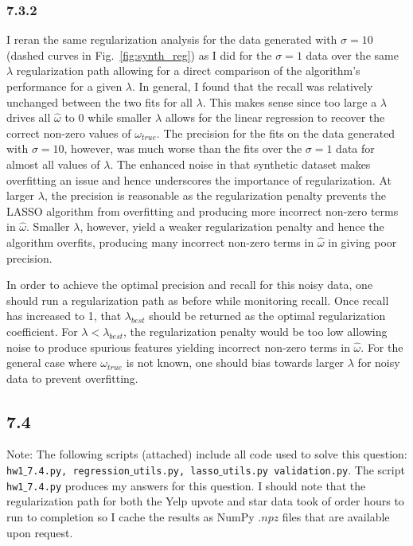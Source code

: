 \documentclass[12pt]{amsart}
\begin{document}
\subsubsection*{7.3.2}

I reran the same regularization analysis for the data generated with $\sigma = 10$ (dashed curves in Fig.~\ref{fig:synth_reg}) as I did for the $\sigma = 1$ data over the same $\lambda$ regularization path allowing for a direct comparison of the algorithm's performance for a given $\lambda$.  In general, I found that the recall was relatively unchanged between the two fits for all $\lambda$.  This makes sense since too large a $\lambda$ drives all $\hat{\omega}$ to 0 while smaller $\lambda$ allows for the linear regression to recover the correct non-zero values of $\omega_{true}$.  The precision for the fits on the data generated with $\sigma = 10$, however, was much worse than the fits over the $\sigma = 1$ data for almost all values of $\lambda$.  The enhanced noise in that synthetic dataset makes overfitting an issue and hence underscores the importance of regularization.  At larger $\lambda$, the precision is reasonable as the regularization penalty prevents the LASSO algorithm from overfitting and producing more incorrect non-zero terms in $\hat{\omega}$.  Smaller $\lambda$, however, yield a weaker regularization penalty and hence the algorithm overfits, producing many incorrect non-zero terms in $\hat{\omega}$ in giving poor precision.  

In order to achieve the optimal precision and recall for this noisy data, one should run a regularization path as before while monitoring recall.  Once recall has increased to 1, that $\lambda_{best}$ should be returned as the optimal regularization coefficient.  For $\lambda < \lambda_{best}$, the regularization penalty would be too low allowing noise to produce spurious features yielding incorrect non-zero terms in $\hat{\omega}$.  For the general case where $\omega_{true}$ is not known, one should bias towards larger $\lambda$ for noisy data to prevent overfitting.

\subsection*{7.4}

Note: The following scripts (attached) include all code used to solve this question: {\tt hw1$\_$7.4.py, regression$\_$utils.py, lasso$\_$utils.py  validation.py}.  The script {\tt hw1$\_$7.4.py} produces my answers for this question.  I should note that the regularization path for both the Yelp upvote and star data took of order hours to run to completion so I cache the results as NumPy $.npz$ files that are available upon request.  
\end{document}
